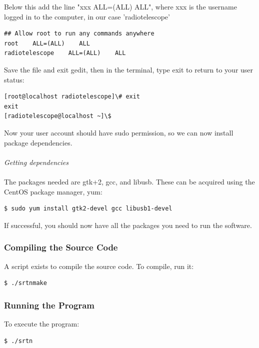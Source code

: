 \documentclass[11pt]{article} %
\begin{document}
\noindent Below this add the line "xxx ALL=(ALL) ALL", where xxx is the username logged in to the computer, in our case 'radiotelescope'

\begin{lstlisting}[frame=single]
## Allow root to run any commands anywhere
root    ALL=(ALL)    ALL
radiotelescope    ALL=(ALL)    ALL
\end{lstlisting}

\noindent Save the file and exit gedit, then in the terminal, type exit to return to your user status:

\begin{lstlisting}[frame=single]
[root@localhost radiotelescope]\# exit
exit
[radiotelescope@localhost ~]\$
\end{lstlisting}

\noindent Now your user account should have sudo permission, so we can now install package dependencies.
\\ \\
\emph{Getting dependencies}
\\ \\
The packages needed are gtk+2, gcc, and libusb. These can be acquired using the CentOS package manager, yum:

\begin{lstlisting}[frame=single]
$ sudo yum install gtk2-devel gcc libusb1-devel
\end{lstlisting}

\noindent If successful, you should now have all the packages you need to run the software.


\subsubsection{Compiling the Source Code}
 A script exists to compile the source code. To compile, run it:

\begin{lstlisting}[frame=single]
$ ./srtnmake
\end{lstlisting}


\subsubsection{Running the Program}
To execute the program:

\begin{lstlisting}[frame=single]
$ ./srtn
\end{lstlisting}
\end{document}
